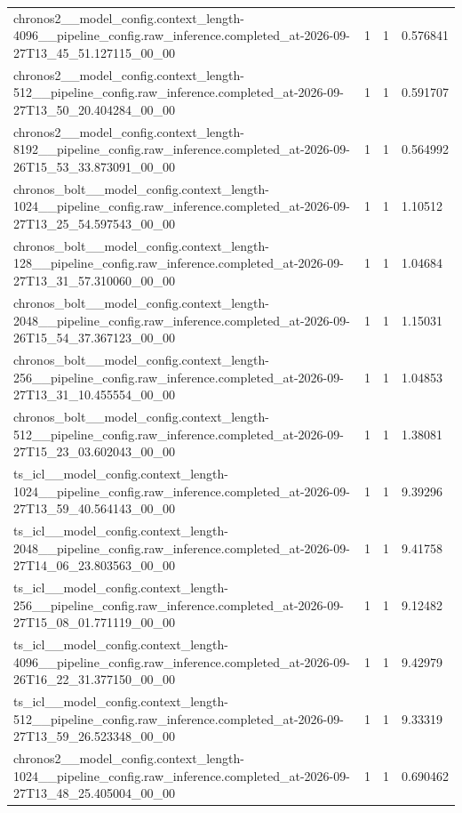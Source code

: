 \begin{tabular}{llll}
chronos2\_\_model\_config.context\_length-4096\_\_pipeline\_config.raw\_inference.completed\_at-2026-09-27T13\_45\_51.127115\_00\_00 & 1 & 1 & 0.576841 \\
chronos2\_\_model\_config.context\_length-512\_\_pipeline\_config.raw\_inference.completed\_at-2026-09-27T13\_50\_20.404284\_00\_00 & 1 & 1 & 0.591707 \\
chronos2\_\_model\_config.context\_length-8192\_\_pipeline\_config.raw\_inference.completed\_at-2026-09-26T15\_53\_33.873091\_00\_00 & 1 & 1 & 0.564992 \\
chronos\_bolt\_\_model\_config.context\_length-1024\_\_pipeline\_config.raw\_inference.completed\_at-2026-09-27T13\_25\_54.597543\_00\_00 & 1 & 1 & 1.10512 \\
chronos\_bolt\_\_model\_config.context\_length-128\_\_pipeline\_config.raw\_inference.completed\_at-2026-09-27T13\_31\_57.310060\_00\_00 & 1 & 1 & 1.04684 \\
chronos\_bolt\_\_model\_config.context\_length-2048\_\_pipeline\_config.raw\_inference.completed\_at-2026-09-26T15\_54\_37.367123\_00\_00 & 1 & 1 & 1.15031 \\
chronos\_bolt\_\_model\_config.context\_length-256\_\_pipeline\_config.raw\_inference.completed\_at-2026-09-27T13\_31\_10.455554\_00\_00 & 1 & 1 & 1.04853 \\
chronos\_bolt\_\_model\_config.context\_length-512\_\_pipeline\_config.raw\_inference.completed\_at-2026-09-27T15\_23\_03.602043\_00\_00 & 1 & 1 & 1.38081 \\
ts\_icl\_\_model\_config.context\_length-1024\_\_pipeline\_config.raw\_inference.completed\_at-2026-09-27T13\_59\_40.564143\_00\_00 & 1 & 1 & 9.39296 \\
ts\_icl\_\_model\_config.context\_length-2048\_\_pipeline\_config.raw\_inference.completed\_at-2026-09-27T14\_06\_23.803563\_00\_00 & 1 & 1 & 9.41758 \\
ts\_icl\_\_model\_config.context\_length-256\_\_pipeline\_config.raw\_inference.completed\_at-2026-09-27T15\_08\_01.771119\_00\_00 & 1 & 1 & 9.12482 \\
ts\_icl\_\_model\_config.context\_length-4096\_\_pipeline\_config.raw\_inference.completed\_at-2026-09-26T16\_22\_31.377150\_00\_00 & 1 & 1 & 9.42979 \\
ts\_icl\_\_model\_config.context\_length-512\_\_pipeline\_config.raw\_inference.completed\_at-2026-09-27T13\_59\_26.523348\_00\_00 & 1 & 1 & 9.33319 \\
chronos2\_\_model\_config.context\_length-1024\_\_pipeline\_config.raw\_inference.completed\_at-2026-09-27T13\_48\_25.405004\_00\_00 & 1 & 1 & 0.690462 \\

\end{tabular}
